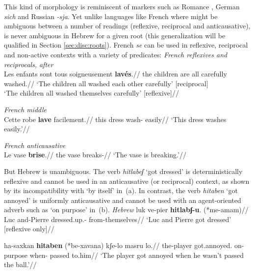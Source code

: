 This kind of morphology is reminiscent of markers such as Romance , German \emph{sich} and Russian \emph{-sja}. Yet unlike languages like French where  might be ambiguous between a number of readings (reflexive, reciprocal and anticausative), {\thit} is never ambiguous in Hebrew for a given root (this generalization will be qualified in Section \ref{sec:disc:roots}). French \emph{se} can be used in reflexive, reciprocal and non-active contexts with a variety of predicates:
\pex
	\a \textit{French reflexives and reciprocals, after} \citet[839]{labelle08}\\
	\begingl
	\gla Les enfants  sont tous soigneusement \textbf{lav\'es}.//
	\glb the children  are all carefully washed.//
	\glft `The children all washed each other carefully' \hfill [reciprocal]\\
	`The children all washed themselves carefully' \hfill [reflexive]//
	\endgl

	\a \textit{French middle} \citep[835]{labelle08}\\
	\begingl
	\gla Cette robe  \textbf{lave} facilement.//
	\glb this dress  wash- easily//
	\glft `This dress washes easily.'//
	\endgl
	
	\a \textit{French anticausative} \citep[835]{labelle08}\\
	\begingl
	\gla Le vase  \textbf{brise}.//
	\glb the vase  breaks-//
	\glft `The vase is breaking.'//
	\endgl
\xe

But Hebrew {\thit} is unambiguous. The verb \emph{hitlabeʃ} `got dressed' is deterministically reflexive and cannot be used in an anticausative (or reciprocal) context, as shown by its incompatibility with `by itself' in~(\nextx a). In contrast, the verb \emph{hita\texttslig ben} `got annoyed' is uniformly anticausative and cannot be used with an agent-oriented adverb such as `on purpose' \citep{alexiadouanagnostopoulou04} in~(\nextx b).
\pex \textit{Hebrew}
	\a \begingl
	\gla luk ve-pier \textbf{hitlabʃ-u}. (*me-a{\texttslig}mam)//
	\glb Luc and-Pierre dressed.up.- \phantom{(*}from-themselves//
	\glft `Luc and Pierre got dressed' \hfill [reflexive only]//
	\endgl

	\a \begingl
	\gla ha-saxkan \textbf{hita\texttslig ben} (*be-xavana) kʃe-lo masru lo.//
	\glb the-player got.annoyed. \phantom{(*}on-purpose when- passed to.him//
	\glft `The player got annoyed when he wasn't passed the ball.'//
	\endgl
\xe

